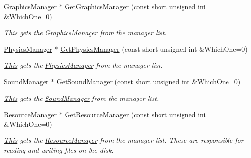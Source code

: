 \begin{DoxyCompactItemize}
\hyperlink{classphys_1_1GraphicsManager}{GraphicsManager} $\ast$ \hyperlink{classphys_1_1World_a15f968adb5d841da6c5eb51607a8f525}{GetGraphicsManager} (const short unsigned int \&WhichOne=0)
\begin{DoxyCompactList}\small\item\em \hyperlink{structThis}{This} gets the \hyperlink{classphys_1_1GraphicsManager}{GraphicsManager} from the manager list. \item\end{DoxyCompactList}\item 
\hyperlink{classphys_1_1PhysicsManager}{PhysicsManager} $\ast$ \hyperlink{classphys_1_1World_a1b9eb6206ee15c2ef49665a07de3d83c}{GetPhysicsManager} (const short unsigned int \&WhichOne=0)
\begin{DoxyCompactList}\small\item\em \hyperlink{structThis}{This} gets the \hyperlink{classphys_1_1PhysicsManager}{PhysicsManager} from the manager list. \item\end{DoxyCompactList}\item 
\hyperlink{classphys_1_1SoundManager}{SoundManager} $\ast$ \hyperlink{classphys_1_1World_ac662bf5d5737a99cd3bc3ff45e7d79b8}{GetSoundManager} (const short unsigned int \&WhichOne=0)
\begin{DoxyCompactList}\small\item\em \hyperlink{structThis}{This} gets the \hyperlink{classphys_1_1SoundManager}{SoundManager} from the manager list. \item\end{DoxyCompactList}\item 
\hyperlink{classphys_1_1ResourceManager}{ResourceManager} $\ast$ \hyperlink{classphys_1_1World_a8a5381637922598411a4369be6904228}{GetResourceManager} (const short unsigned int \&WhichOne=0)
\begin{DoxyCompactList}\small\item\em \hyperlink{structThis}{This} gets the \hyperlink{classphys_1_1ResourceManager}{ResourceManager} from the manager list. These are responsible for reading and writing files on the disk. \item\end{DoxyCompactList}\end{DoxyCompactItemize}

